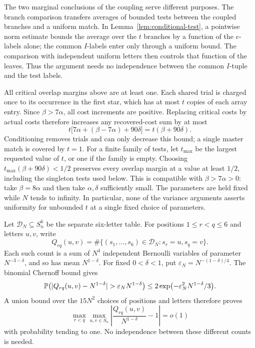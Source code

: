 The two marginal conclusions of the coupling serve different purposes.
The branch comparison transfers averages of bounded tests between the
coupled branches and a uniform match.  In
Lemma~\ref{lem:conditional-test}, a pointwise norm estimate bounds the
average over the $t$ branches by a function of the $e$-labels alone; the common
$I$-labels enter only through a uniform bound.  The comparison with
independent uniform letters then controls that function of the leaves.
Thus the argument needs no independence between the common $I$-tuple
and the test labels.

All critical overlap margins above are at least one.  Each shared trial
is charged once to its occurrence in the first star, which has at most
$t$ copies of each array entry.  Since $\beta>7\alpha$, all cost
increments are positive.  Replacing critical costs by actual costs
therefore increases any recovered-cost sum by at most
\[
t\bigl[7\alpha+(\beta-7\alpha)+90\delta\bigr]
=t(\beta+90\delta).
\]
Conditioning removes trials and can only decrease this bound; a single
master match is covered by $t=1$.  For a finite family of tests, let
$t_{\max}$ be the largest requested value of $t$, or one if the family
is empty.  Choosing $t_{\max}(\beta+90\delta)<1/2$ preserves every
overlap margin at a value at least $1/2$, including the singleton
tests used below.  This is compatible with $\beta>7\alpha>0$: take
$\beta=8\alpha$ and then take $\alpha,\delta$ sufficiently small.
The parameters are held fixed while $N$ tends to infinity.  In
particular, none of the variance arguments asserts uniformity for
unbounded $t$ at a single fixed choice of parameters.

Let $\mathcal D_N\subseteq S_n^6$ be the separate six-letter table.
For positions $1\leq r<q\leq6$ and letters $u,v$, write
\[
Q_{rq}(u,v)
 =\#\{(s_1,\ldots,s_6)\in\mathcal D_N:s_r=u, s_q=v\}.
\]
Each such count is a sum of $N^4$ independent Bernoulli variables
of parameter $N^{-3-\delta}$, and so has mean $N^{1-\delta}$.
For fixed $0<\delta<1$, put
$\varepsilon_N=N^{-(1-\delta)/4}$.  The binomial Chernoff bound gives
\[
\Prob\bigl(|Q_{rq}(u,v)-N^{1-\delta}|>
       \varepsilon_NN^{1-\delta}\bigr)
 \leq 2\exp\bigl(-\varepsilon_N^2N^{1-\delta}/3\bigr).
\]
A union bound over the $15N^2$ choices of positions and letters
therefore proves
\begin{equation}\label{sample:eq-six-pair}
\max_{r<q}\max_{u,v\in S_n}
 \left|\frac{Q_{rq}(u,v)}{N^{1-\delta}}-1\right|=o(1)
\end{equation}
with probability tending to one.  No independence between these
different counts is needed.

